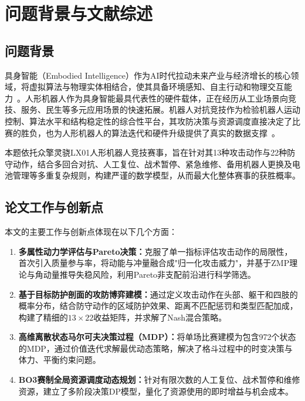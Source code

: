 \documentclass[a4paper,12pt]{article}
\numberwithin{equation}{section}
\numberwithin{table}{section}
\numberwithin{figure}{section}
\begin{document}
\clearpage
\setcounter{page}{1}
\pagestyle{plain}

\section{问题背景与文献综述}

\subsection{问题背景}

具身智能（Embodied Intelligence）作为AI时代拉动未来产业与经济增长的核心领域，将虚拟算法与物理实体相结合，使其具备环境感知、自主行动和物理交互能力~\cite{ref1}。人形机器人作为具身智能最具代表性的硬件载体，正在经历从工业场景向竞技、服务、民生等多元应用场景的快速拓展。机器人对抗竞技作为检验机器人运动控制、算法水平和结构稳定性的综合性平台，其攻防决策与资源调度直接决定了比赛的胜负，也为人形机器人的算法迭代和硬件升级提供了真实的数据支撑~\cite{ref2}。

本题依托众擎灵骁LX01人形机器人竞技赛事，旨在针对其13种攻击动作与22种防守动作，结合多回合对抗、人工复位、战术暂停、紧急维修、备用机器人更换及电池管理等多重复杂规则，构建严谨的数学模型，从而最大化整体赛事的获胜概率。

\subsection{论文工作与创新点}

本文的主要工作与创新点体现在以下几个方面：

\begin{enumerate}
    \item \textbf{多属性动力学评估与Pareto决策：}克服了单一指标评估攻击动作的局限性，首次引入质量参与率，将动能与冲量融合成"归一化攻击威力"，并基于ZMP理论与角动量推导失稳风险，利用Pareto非支配前沿进行科学筛选。
    \item \textbf{基于目标防护剖面的攻防博弈建模：}通过定义攻击动作在头部、躯干和四肢的概率分布，结合防守动作的区域防护效果、距离不匹配惩罚和类型匹配加成，构建了精细的$13 \times 22$收益矩阵，并求解了Nash混合策略。
    \item \textbf{高维离散状态马尔可夫决策过程（MDP）：}将单场比赛建模为包含972个状态的MDP，通过价值迭代求解最优动态策略，解决了格斗过程中的时变决策与体力、平衡约束问题。
    \item \textbf{BO3赛制全局资源调度动态规划：}针对有限次数的人工复位、战术暂停和维修资源，建立了多阶段决策DP模型，量化了资源使用的即时增益与机会成本。
\end{enumerate}
\end{document}
